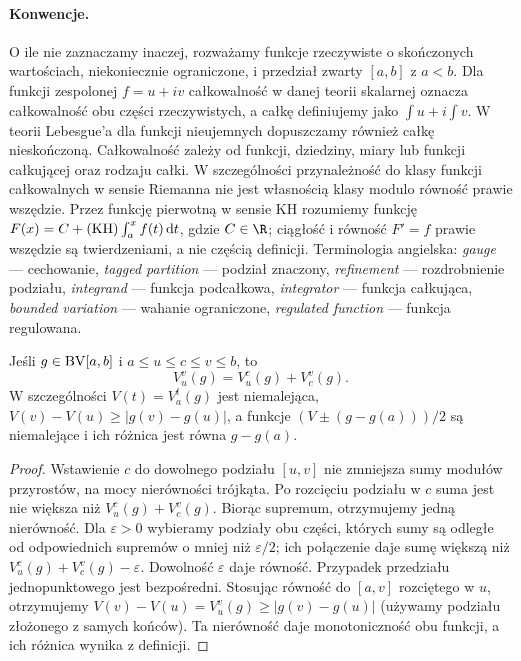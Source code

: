 \paragraph{Konwencje.}
O ile nie zaznaczamy inaczej, rozważamy funkcje rzeczywiste
o skończonych wartościach, niekoniecznie ograniczone, i przedział
zwarty $[a,b]$ z $a<b$. Dla funkcji zespolonej $f=u+iv$
całkowalność w danej teorii skalarnej oznacza całkowalność
obu części rzeczywistych, a całkę definiujemy jako
$\int u+i\int v$. W teorii Lebesgue'a dla funkcji nieujemnych
dopuszczamy również całkę nieskończoną.
Całkowalność zależy od funkcji, dziedziny, miary lub funkcji
całkującej oraz rodzaju całki. W szczególności przynależność
do klasy funkcji całkowalnych w sensie Riemanna nie jest
własnością klasy modulo równość prawie wszędzie.
Przez funkcję pierwotną w sensie KH rozumiemy funkcję
$F(x)=C+(\mathrm{KH})\int_a^x f(t)\,\mathrm dt$, gdzie $C\in\R$;
ciągłość i równość $F'=f$ prawie wszędzie są twierdzeniami,
a nie częścią definicji.
Terminologia angielska: \emph{gauge} --- cechowanie,
\emph{tagged partition} --- podział znaczony,
\emph{refinement} --- rozdrobnienie podziału,
\emph{integrand} --- funkcja podcałkowa,
\emph{integrator} --- funkcja całkująca,
\emph{bounded variation} --- wahanie ograniczone,
\emph{regulated function} --- funkcja regulowana.

\begin{lemat}\label{ma1:kh:lem:variation-additivity}\label{it:lem:rs-variation}
Jeśli $g\in\mathrm{BV}[a,b]$ i $a\le u\le c\le v\le b$, to
\[
 V_u^v(g)=V_u^c(g)+V_c^v(g).
\]
W szczególności $V(t)=V_a^t(g)$ jest niemalejąca, $V(v)-V(u)\ge |g(v)-g(u)|$, a funkcje $(V\pm(g-g(a)))/2$ są niemalejące i ich różnica jest równa $g-g(a)$.
\end{lemat}
\begin{proof}
Wstawienie $c$ do dowolnego podziału $[u,v]$ nie zmniejsza sumy modułów przyrostów, na mocy nierówności trójkąta. Po rozcięciu podziału w $c$ suma jest nie większa niż $V_u^c(g)+V_c^v(g)$. Biorąc supremum, otrzymujemy jedną nierówność. Dla $\varepsilon>0$ wybieramy podziały obu części, których sumy są odległe od odpowiednich supremów o mniej niż $\varepsilon/2$; ich połączenie daje sumę większą niż $V_u^c(g)+V_c^v(g)-\varepsilon$. Dowolność $\varepsilon$ daje równość. Przypadek przedziału jednopunktowego jest bezpośredni. Stosując równość do $[a,v]$ rozciętego w $u$, otrzymujemy $V(v)-V(u)=V_u^v(g)\ge |g(v)-g(u)|$ (używamy podziału złożonego z samych końców). Ta nierówność daje monotoniczność obu funkcji, a ich różnica wynika z definicji.
\end{proof}
